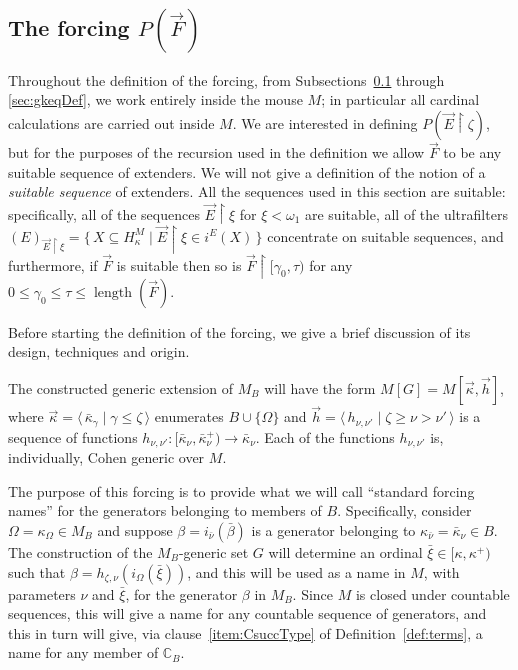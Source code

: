 \documentclass[
twoside,
]{article}
\theoremstyle{definition}
\theoremstyle{remark}
\newcommand{\ufFromExt}[2]{(#1)_{#2}}
\newcommand{\forceKappa}{\bar\kappa} %
\newcommand{\ords}{\Omega}
\DeclareMathOperator{\len}{length}
\newcommand{\sing}[1]{\{#1\}}
\newcommand{\set}[1]{\{\,#1\,\}}
\newcommand{\pair}[1]{\langle#1\rangle}
\newcommand{\seq}[1]{\pair{\,#1\,}}
\newcommand{\restrict}{{\upharpoonright}}
\newcommand\chang{\mathbb{C}}
\begin{document}
\subsection[The main forcing]{The forcing $P(\vec F)$}
\label{sec:absolutelyfinal}

Throughout the definition of the forcing, from
Subsections~\ref{sec:absolutelyfinal} through \ref{sec:gkeqDef},  we work entirely inside  the
mouse $M$; in particular all cardinal calculations are carried out
inside $M$.   We are
interested in defining $P(\vec E\restrict\zeta)$, but for the purposes
of the recursion used in the definition we allow $\vec F$ to be any suitable
sequence of extenders.   We will not give a definition of the
notion of a \emph{suitable 
  sequence} of extenders.   All the sequences used in this section are
suitable: specifically, all of the sequences $\vec E\restrict
{\xi}$ for $\xi<\omega_1$ are suitable,  all of the ultrafilters
$\ufFromExt{E}{\vec E\restrict\xi}=\set{X\subseteq H^{M}_{\kappa}\mid \vec E\restrict\xi \in i^{E}(X)}$
concentrate on suitable sequences, and     furthermore, if $\vec F$ is
suitable then so is  $\vec F\restrict[\gamma_0,\tau)$ for any
$0\leq\gamma_0\leq\tau\leq\len(\vec F)$. 

Before starting the definition of the forcing, we give a brief
discussion of its design, techniques and origin.

The constructed generic extension of $M_B$ will have the form 
$
  M[G]=M[\vec\kappa, \vec h] 
$,
where  
  $\vec \kappa =\seq{\forceKappa _\gamma\mid\gamma\leq\zeta}$
  enumerates $B\cup\sing{\ords}$ and 
  $\vec  h=\seq{h_{\nu,\nu'}\mid \zeta\geq\nu>\nu'}$ 
  is a sequence of functions
  $h_{\nu,\nu'}\colon  [\forceKappa _\nu,\forceKappa _{\nu}^{+})\to
  \forceKappa _{\nu}$.  Each of the functions $h_{\nu,\nu'}$ is,
  individually,  Cohen generic over $M$.

  The purpose of this forcing is to provide what
  we will call ``standard forcing names'' for the generators belonging
  to members of $B$.  Specifically, consider 
  $\ords=\kappa_{\ords}\in M_B$ and suppose
  $\beta=i_{\bar\nu}(\bar\beta)$ is a generator belonging to
  $\kappa_{\bar\nu}=\forceKappa_{\nu}\in B$.   The construction of the
  $M_B$-generic set $G$ will determine  an ordinal 
  $\bar\xi\in[\kappa,\kappa^{+})$ such that
  $\beta=h_{\zeta,\nu}(i_{\ords}(\bar\xi))$, and this will be used as
  a name in $M$, with parameters $\nu$ and $\bar\xi$, for
  the generator $\beta$ in $M_B$.
  Since $M$ 
  is closed under countable sequences, this will give a name
  for any countable
  sequence of generators, and this in turn will give, via
  clause~\ref{item:CsuccType} of Definition~\ref{def:terms}, a name
  for any member of $\chang_{B}$.
\end{document}
